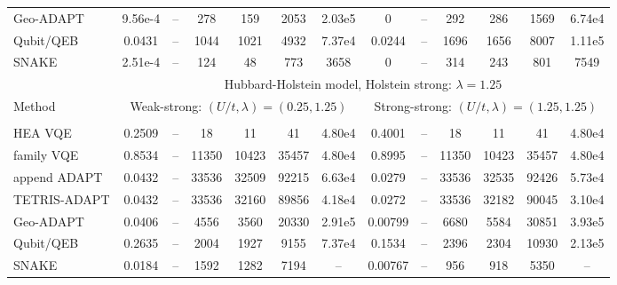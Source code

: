 \documentclass[
  reprint,
  amsmath,
  amssymb,
  aps,
  pra,
  nofootinbib,
  superscriptaddress,
  floatfix
]{revtex4-2}
\newcommand{\metrichead}[1]{\makebox[0.061\textwidth][c]{#1}}
\begin{document}
\begin{widetext}
\begin{minipage}{\textwidth}
\begin{center}
\begin{ruledtabular}
\begin{tabular}{p{}cccccc|cccccc}
Geo-ADAPT & 9.56e-4 & -- & 278 & 159 & 2053 & 2.03e5 & 0 & -- & 292 & 286 & 1569 & 6.74e4\\
Qubit/QEB & 0.0431 & -- & 1044 & 1021 & 4932 & 7.37e4 & 0.0244 & -- & 1696 & 1656 & 8007 & 1.11e5\\
SNAKE & 2.51e-4 & -- & 124 & 48 & 773 & 3658 & 0 & -- & 314 & 243 & 801 & 7549\\
\colrule
& \multicolumn{12}{c}{Hubbard-Holstein model, Holstein strong: $\lambda=1.25$}\\
\cline{2-13}
Method & \multicolumn{6}{c|}{Weak-strong: $(U/t,\lambda)=(0.25,1.25)$} & \multicolumn{6}{c}{Strong-strong: $(U/t,\lambda)=(1.25,1.25)$}\\
\cline{2-7}\cline{8-13}
 & \metrichead{$\Delta E$} & \metrichead{$1-F$} & \metrichead{$N_{2q}$} & \metrichead{$D_{2q}$} & \metrichead{$D_c$} & \metrichead{$S$} & \metrichead{$\Delta E$} & \metrichead{$1-F$} & \metrichead{$N_{2q}$} & \metrichead{$D_{2q}$} & \metrichead{$D_c$} & \metrichead{$S$}\\
\colrule
HEA VQE & 0.2509 & -- & 18 & 11 & 41 & 4.80e4 & 0.4001 & -- & 18 & 11 & 41 & 4.80e4\\
family VQE & 0.8534 & -- & 11350 & 10423 & 35457 & 4.80e4 & 0.8995 & -- & 11350 & 10423 & 35457 & 4.80e4\\
append ADAPT & 0.0432 & -- & 33536 & 32509 & 92215 & 6.63e4 & 0.0279 & -- & 33536 & 32535 & 92426 & 5.73e4\\
TETRIS-ADAPT & 0.0432 & -- & 33536 & 32160 & 89856 & 4.18e4 & 0.0272 & -- & 33536 & 32182 & 90045 & 3.10e4\\
Geo-ADAPT & 0.0406 & -- & 4556 & 3560 & 20330 & 2.91e5 & 0.00799 & -- & 6680 & 5584 & 30851 & 3.93e5\\
Qubit/QEB & 0.2635 & -- & 2004 & 1927 & 9155 & 7.37e4 & 0.1534 & -- & 2396 & 2304 & 10930 & 2.13e5\\
SNAKE & 0.0184 & -- & 1592 & 1282 & 7194 & -- & 0.00767 & -- & 956 & 918 & 5350 & --\\
\end{tabular}
\end{ruledtabular}
\end{center}
\end{minipage}
\par\addvspace{1.0ex}

\end{widetext}
\end{document}
